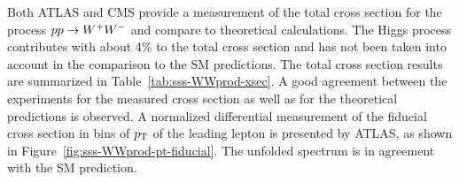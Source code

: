 
Both ATLAS and CMS provide a measurement of the total cross section for the process $pp \rightarrow W^+W^-$
and compare to theoretical calculations. The Higgs process contributes with about 4\% to the total 
cross section and has not been taken into account in the comparison to the SM predictions.
The total cross section results are summarized in Table~\ref{tab:sss-WWprod-xsec}.
A good agreement between the experiments for the measured cross section as well as for the theoretical predictions
is observed.
A normalized differential measurement of the fiducial cross section in bins of $p_{\mathrm{T}}$ of the leading lepton is presented by ATLAS,
as shown in Figure~\ref{fig:sss-WWprod-pt-fiducial}. The unfolded spectrum is in agreement with the SM prediction.

\begin{table}[htp]

\begin{center}
\caption{Summary of measured fiducial and total $\WW$ production cross sections from ATLAS and CMS 
at 7 and 8 TeV center-of-mass energies in the $\lnu\lnu$ final state. The prediction are calculated at NLO in $\alpha_s$.}
\end{center}
\label{tab:sss-WWprod-xsec}
\end{table}%

